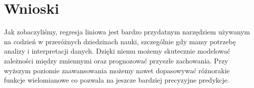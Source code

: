 \documentclass[a4paper,12pt]{article}
\begin{document}
\section{Wnioski}
Jak zobaczyliśmy, regresja liniowa jest bardzo przydatnym narzędziem używanym na codzień w przeróżnych dziedzinach nauki, szczególnie gdy mamy potrzebę analizy i interpretacji danych. Dzięki niemu możemy skutecznie modelować zależności między zmiennymi oraz prognozować przyszłe zachowania. Przy wyższym poziomie zaawansowania możemy nawet dopasowywać różnorakie funkcje wielomianowe co pozwala na jeszcze bardziej precyzyjne predykcje.  


\end{document}
